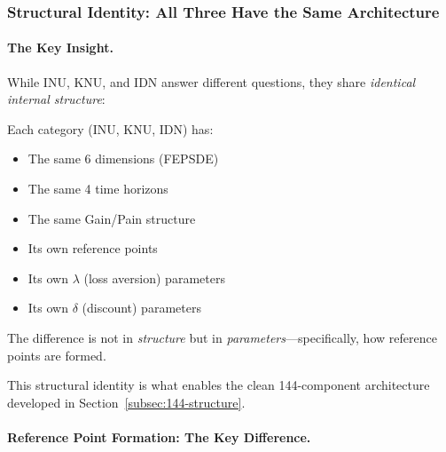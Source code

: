 \subsubsection{Structural Identity: All Three Have the Same Architecture}

\paragraph{The Key Insight.}
While INU, KNU, and IDN answer different questions, they share 
\emph{identical internal structure}:

\begin{tcolorbox}[colback=blue!5!white, colframe=blue!75!black, title=Structural Identity]
Each category (INU, KNU, IDN) has:
\begin{itemize}
\item The same 6 dimensions (FEPSDE)
\item The same 4 time horizons
\item The same Gain/Pain structure
\item Its own reference points
\item Its own $\lambda$ (loss aversion) parameters
\item Its own $\delta$ (discount) parameters
\end{itemize}

The difference is not in \emph{structure} but in \emph{parameters}---specifically, 
how reference points are formed.
\end{tcolorbox}

This structural identity is what enables the clean 144-component architecture
developed in Section~\ref{subsec:144-structure}.

\paragraph{Reference Point Formation: The Key Difference.}


